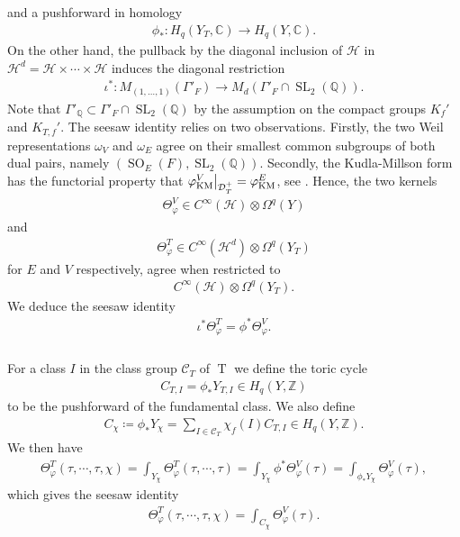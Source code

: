 \documentclass[11pt]{article} %
\newcommand{\8}{\infty}
\newcommand{\Z}{\mathbb{Z}}
\newcommand{\Tbf}{\operatorname{T}}
\newcommand{\SO}{\operatorname{SO}}
\newcommand{\SL}{\operatorname{SL}}
\newcommand{\KM}{\operatorname{KM}}
\newcommand{\D}{\mathcal{D}}
\newcommand{\HH}{\mathscr{H}}
\newcommand{\Q}{\mathbb{Q}}
\newcommand{\C}{\mathbb{C}}
\newcommand{\Ccal}{\mathcal{C}}
\newcommand{\fin}{f}
\newcommand\restr[2]{{%
  \left.\kern-\nulldelimiterspace %
  #1 %
  \vphantom{\big|} %
  \right|_{#2} %
  }}
\theoremstyle{mytheoremstyle}
\theoremstyle{remark}
\numberwithin{equation}{section}
\begin{document}
and a pushforward in homology
\begin{align}
    \phi_\ast \colon H_{q}(Y_T,\C) \longrightarrow H_{q}(Y,\C).
\end{align}
On the other hand, the pullback by the diagonal inclusion of $\HH$ in $\HH^d=\HH \times \cdots \times \HH$ induces the diagonal restriction
\begin{align}
    \iota^\ast \colon M_{(1,\dots,1)}( \Gamma'_F) \longrightarrow M_{d}(\Gamma'_F \cap \SL_2(\Q)).
\end{align}
{  Note that $\Gamma'_\Q \subset \Gamma'_F \cap \SL_2(\Q)$ by the assumption on the compact groups $K_\fin'$ and $K_{T,\fin}'$.}
The seesaw identity relies on two observations. Firstly, the two Weil representations $\omega_V$ and $\omega_E$ agree on their smallest common subgroups of both dual pairs, namely $(\SO_E(F),\SL_2(\Q))$. Secondly, the Kudla-Millson form has the functorial property that $\restr{\varphi_{\KM}^V}{\D_T^+}=\varphi_{\KM}^E$, see \cite[Equation.~(5.10)]{rbrkmmq}. Hence, the two kernels
\begin{align}
    \Theta^V_{\varphi} \in C^\8 \left ( \HH\right ) \otimes \Omega^q(Y)
\end{align}
and 
\begin{align}
    \Theta^T_{\varphi} \in C^\8 \left ( \HH^d \right ) \otimes \Omega^q(Y_T)
\end{align}
for $E$ and $V$ respectively, agree when restricted to 
\begin{align}
    C^\8 \left (  \HH \right ) \otimes \Omega^{q}(Y_T).
\end{align}
We deduce the seesaw identity
\begin{align} \label{seesaw}
  \iota^\ast \Theta^T_{\varphi} = \phi^\ast \Theta^V_{\varphi}.
\end{align}
\subsubsection{} For a class $I$ in the class group $\Ccal_T$ of $\Tbf$ we define the toric cycle
\begin{align}
    C_{T,I} = \phi_\ast Y_{T,I} \in H_{q}(Y,\Z)
\end{align}
to be the pushforward of the fundamental class. We also define
\begin{align} \label{cycledef}
    C_\chi \coloneqq \phi_\ast Y_\chi=  \sum_{I \in \Ccal_T} \chi_\fin(I) C_{T,I} \in H_{q}(Y,\Z).
\end{align} We then have
\begin{align}
    \Theta^T_{\varphi}(\tau, \cdots, \tau,\chi) = \int_{Y_\chi} \Theta^T_{\varphi}(\tau, \cdots, \tau) = \int_{Y_\chi} \phi^\ast \Theta^V_\varphi(\tau) = \int_{\phi_\ast Y_\chi} \Theta^V_\varphi(\tau),
\end{align}
which gives the seesaw identity
\begin{align} \label{seesaw1}
    \Theta^T_{\varphi}(\tau, \cdots, \tau,\chi) = \int_{C_\chi} \Theta^V_{\varphi}(\tau).
\end{align}
\end{document}
